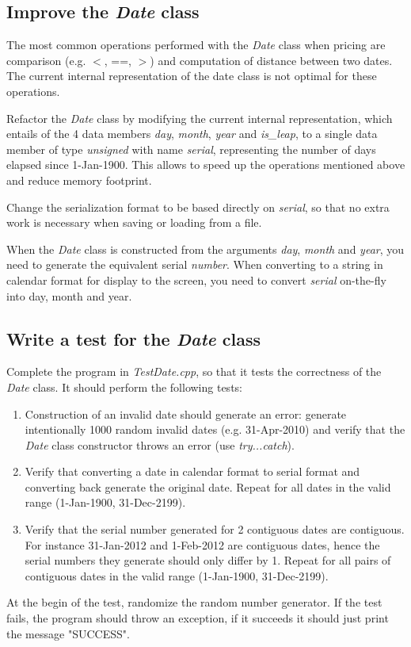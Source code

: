 \documentclass[10pt]{article}
\begin{document}
\subsection{Improve the \textit{Date} class}
The most common operations performed with the \textit{Date} class when pricing are comparison (e.g. $<$, ==, $>$) and computation of distance between two dates. The current internal representation of the date class is not optimal for these operations.

Refactor the \textit{Date} class by modifying the current internal representation, which entails of the 4 data members \textit{day}, \textit{month}, \textit{year} and \textit{is\_leap}, to a single data member of type \textit{unsigned} with name \textit{serial}, representing the number of days elapsed since 1-Jan-1900. This allows to speed up the operations mentioned above and reduce memory footprint.

Change the serialization format to be based directly on \textit{serial}, so that no extra work is necessary when saving or loading from a file.

When the \textit{Date} class is constructed from the arguments \textit{day}, \textit{month} and \textit{year}, you need to generate the equivalent serial \textit{number}. When converting to a string in calendar format for display to the screen, you need to convert \textit{serial} on-the-fly into day, month and year.


\subsection{Write a test for the \textit{Date} class}
Complete the program in \textit{TestDate.cpp}, so that it tests the correctness of the \textit{Date} class. It should perform the following tests:
\begin{enumerate}
\item Construction of an invalid date should generate an error: generate intentionally 1000 random invalid dates (e.g. 31-Apr-2010) and verify that the \textit{Date} class constructor throws an error (use \textit{try...catch}).
\item Verify that converting a date in calendar format to serial format and converting back generate the original date. Repeat for all dates in the valid range (1-Jan-1900, 31-Dec-2199).
\item Verify that the serial number generated for 2 contiguous dates are contiguous. For instance 31-Jan-2012 and 1-Feb-2012 are contiguous dates, hence the serial numbers they generate should only differ by 1. Repeat for all pairs of contiguous dates in the valid range (1-Jan-1900, 31-Dec-2199).
\end{enumerate}
At the begin of the test, randomize the random number generator. If the test fails, the program should throw an exception, if it succeeds it should just print the message "SUCCESS".
\end{document}
